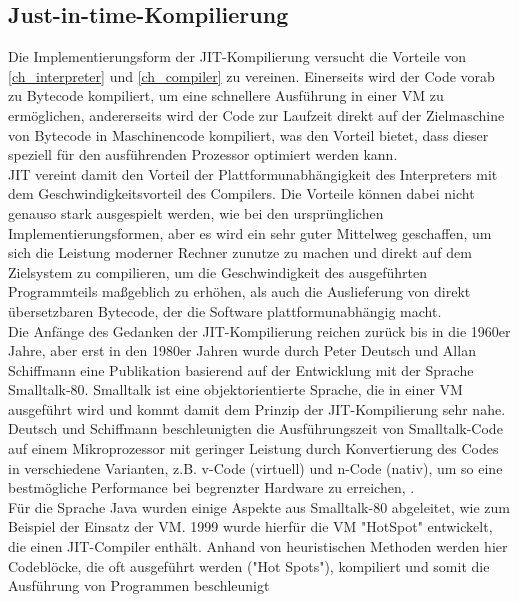 \subsection{Just-in-time-Kompilierung} \label{ch_jit}
Die Implementierungsform der \ac{JIT}-Kompilierung versucht die Vorteile von \autoref{ch_interpreter} und \autoref{ch_compiler} zu vereinen. Einerseits wird der Code vorab zu Bytecode kompiliert, um eine schnellere Ausführung in einer \ac{VM} zu ermöglichen, andererseits wird der Code zur Laufzeit direkt auf der Zielmaschine von Bytecode in Maschinencode kompiliert, was den Vorteil bietet, dass dieser speziell für den ausführenden Prozessor optimiert werden kann.\\
\ac{JIT} vereint damit den Vorteil der Plattformunabhängigkeit des Interpreters mit dem Geschwindigkeitsvorteil des Compilers. Die Vorteile können dabei nicht genauso stark ausgespielt werden, wie bei den ursprünglichen Implementierungsformen, aber es wird ein sehr guter Mittelweg geschaffen, um sich die Leistung moderner Rechner zunutze zu machen und direkt auf dem Zielsystem zu compilieren, um die Geschwindigkeit des ausgeführten Programmteils maßgeblich zu erhöhen, als auch die Auslieferung von direkt übersetzbaren Bytecode, der die Software plattformunabhängig macht.\\
Die Anfänge des Gedanken der \ac{JIT}-Kompilierung reichen zurück bis in die 1960er Jahre, aber erst in den 1980er Jahren wurde durch Peter Deutsch und Allan Schiffmann eine Publikation basierend auf der Entwicklung mit der Sprache Smalltalk-80. Smalltalk ist eine objektorientierte Sprache, die in einer \ac{VM} ausgeführt wird und kommt damit dem Prinzip der \ac{JIT}-Kompilierung sehr nahe. Deutsch und Schiffmann beschleunigten die Ausführungszeit von Smalltalk-Code auf einem Mikroprozessor mit geringer Leistung durch Konvertierung des Codes in verschiedene Varianten, z.B. v-Code (virtuell) und n-Code (nativ), um so eine bestmögliche Performance bei begrenzter Hardware zu erreichen, \cite[vgl. Deutsch und Schiffmann 1984, S.1ff]{Deutsch_Schiffmann1984}.\\
Für die Sprache Java wurden einige Aspekte aus Smalltalk-80 abgeleitet, wie zum Beispiel der Einsatz der \ac{VM}. 1999 wurde hierfür die \ac{VM} "HotSpot" entwickelt, die einen \ac{JIT}-Compiler enthält. Anhand von heuristischen Methoden werden hier Codeblöcke, die oft ausgeführt werden ("Hot Spots"), kompiliert und somit die Ausführung von Programmen beschleunigt \cite[vgl. Kotzmann und Wimmer 2008, S.2ff]{KotzmannWimmer2008}


